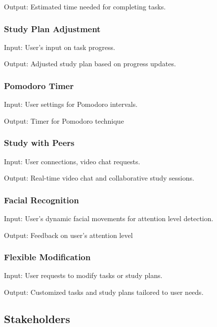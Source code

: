 \documentclass{article}
\begin{document}
\noindent Output: Estimated time needed for completing tasks.

\subsubsection{Study Plan Adjustment}
\vspace{1ex}

\noindent Input: User's input on task progress.

\noindent Output: Adjusted study plan based on progress updates.

\subsubsection{Pomodoro Timer}
\vspace{1ex}

\noindent Input: User settings for Pomodoro intervals.

\noindent Output: Timer for Pomodoro technique


\subsubsection{Study with Peers}
\vspace{1ex}

\noindent Input: User connections, video chat requests.

\noindent Output: Real-time video chat and collaborative study sessions.
     

\subsubsection{Facial Recognition}
\vspace{1ex}

\noindent Input: User's dynamic facial movements for attention level detection.

\noindent Output: Feedback on user's attention level

\subsubsection{Flexible Modification}
\vspace{1ex}

\noindent Input: User requests to modify tasks or study plans.

\noindent Output: Customized tasks and study plans tailored to user needs.


\subsection{Stakeholders}
\end{document}
